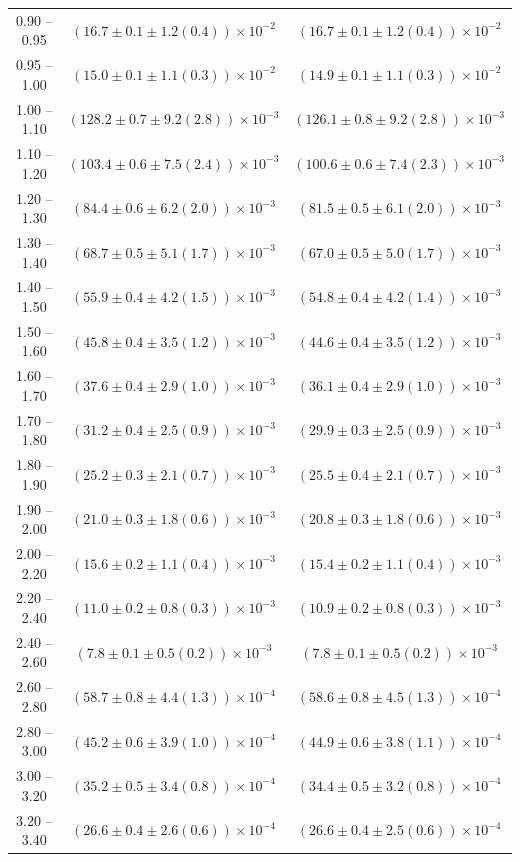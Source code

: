 \begin{table}
\begin{center}
\begin{tabular}{ c | c c }
0.90 -- 0.95 & $(16.7\pm0.1\pm1.2(0.4))\times10^{-2}$ & $(16.7\pm0.1\pm1.2(0.4))\times10^{-2}$ \\ 
0.95 -- 1.00 & $(15.0\pm0.1\pm1.1(0.3))\times10^{-2}$ & $(14.9\pm0.1\pm1.1(0.3))\times10^{-2}$ \\ 
1.00 -- 1.10 & $(128.2\pm0.7\pm9.2(2.8))\times10^{-3}$ & $(126.1\pm0.8\pm9.2(2.8))\times10^{-3}$ \\ 
1.10 -- 1.20 & $(103.4\pm0.6\pm7.5(2.4))\times10^{-3}$ & $(100.6\pm0.6\pm7.4(2.3))\times10^{-3}$ \\ 
1.20 -- 1.30 & $(84.4\pm0.6\pm6.2(2.0))\times10^{-3}$ & $(81.5\pm0.5\pm6.1(2.0))\times10^{-3}$ \\ 
1.30 -- 1.40 & $(68.7\pm0.5\pm5.1(1.7))\times10^{-3}$ & $(67.0\pm0.5\pm5.0(1.7))\times10^{-3}$ \\ 
1.40 -- 1.50 & $(55.9\pm0.4\pm4.2(1.5))\times10^{-3}$ & $(54.8\pm0.4\pm4.2(1.4))\times10^{-3}$ \\ 
1.50 -- 1.60 & $(45.8\pm0.4\pm3.5(1.2))\times10^{-3}$ & $(44.6\pm0.4\pm3.5(1.2))\times10^{-3}$ \\ 
1.60 -- 1.70 & $(37.6\pm0.4\pm2.9(1.0))\times10^{-3}$ & $(36.1\pm0.4\pm2.9(1.0))\times10^{-3}$ \\ 
1.70 -- 1.80 & $(31.2\pm0.4\pm2.5(0.9))\times10^{-3}$ & $(29.9\pm0.3\pm2.5(0.9))\times10^{-3}$ \\ 
1.80 -- 1.90 & $(25.2\pm0.3\pm2.1(0.7))\times10^{-3}$ & $(25.5\pm0.4\pm2.1(0.7))\times10^{-3}$ \\ 
1.90 -- 2.00 & $(21.0\pm0.3\pm1.8(0.6))\times10^{-3}$ & $(20.8\pm0.3\pm1.8(0.6))\times10^{-3}$ \\ 
2.00 -- 2.20 & $(15.6\pm0.2\pm1.1(0.4))\times10^{-3}$ & $(15.4\pm0.2\pm1.1(0.4))\times10^{-3}$ \\ 
2.20 -- 2.40 & $(11.0\pm0.2\pm0.8(0.3))\times10^{-3}$ & $(10.9\pm0.2\pm0.8(0.3))\times10^{-3}$ \\ 
2.40 -- 2.60 & $(7.8\pm0.1\pm0.5(0.2))\times10^{-3}$ & $(7.8\pm0.1\pm0.5(0.2))\times10^{-3}$ \\ 
2.60 -- 2.80 & $(58.7\pm0.8\pm4.4(1.3))\times10^{-4}$ & $(58.6\pm0.8\pm4.5(1.3))\times10^{-4}$ \\ 
2.80 -- 3.00 & $(45.2\pm0.6\pm3.9(1.0))\times10^{-4}$ & $(44.9\pm0.6\pm3.8(1.1))\times10^{-4}$ \\ 
3.00 -- 3.20 & $(35.2\pm0.5\pm3.4(0.8))\times10^{-4}$ & $(34.4\pm0.5\pm3.2(0.8))\times10^{-4}$ \\ 
3.20 -- 3.40 & $(26.6\pm0.4\pm2.6(0.6))\times10^{-4}$ & $(26.6\pm0.4\pm2.5(0.6))\times10^{-4}$ \\ 

\end{tabular}
\end{center}
\end{table}
